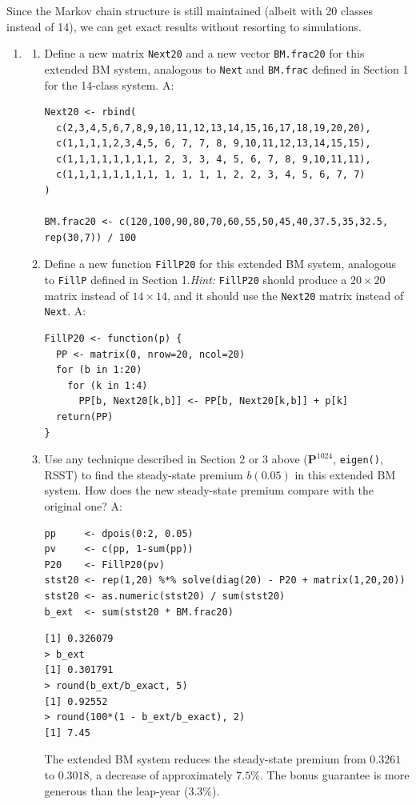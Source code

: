 \documentclass{article}
\begin{document}
Since the Markov chain structure is still maintained (albeit with 20 classes instead of 14), we can get exact results without resorting to simulations.
 
\begin{enumerate}
  \item [$\boldsymbol{Q}_8$]
  \begin{enumerate}
    \item [(a)] Define a new matrix \texttt{Next20} and a new vector \texttt{BM.frac20} for this extended BM system, analogous to \texttt{Next} and \texttt{BM.frac} defined in Section 1 for the 14-class system. \newline
    A:
\begin{lstlisting}
Next20 <- rbind(
  c(2,3,4,5,6,7,8,9,10,11,12,13,14,15,16,17,18,19,20,20),
  c(1,1,1,1,2,3,4,5, 6, 7, 7, 8, 9,10,11,12,13,14,15,15),
  c(1,1,1,1,1,1,1,1, 2, 3, 3, 4, 5, 6, 7, 8, 9,10,11,11),
  c(1,1,1,1,1,1,1,1, 1, 1, 1, 1, 2, 2, 3, 4, 5, 6, 7, 7)
)

BM.frac20 <- c(120,100,90,80,70,60,55,50,45,40,37.5,35,32.5, rep(30,7)) / 100
\end{lstlisting}
    \item [(b)] Define a new function \texttt{FillP20} for this extended BM system, analogous to \texttt{FillP} defined in Section 1.\textit{Hint:} \texttt{FillP20} should produce a $20 \times 20$ matrix instead of $14 \times 14$, and it should use the \texttt{Next20} matrix instead of \texttt{Next}. \newline
    A:
\begin{lstlisting}
FillP20 <- function(p) {
  PP <- matrix(0, nrow=20, ncol=20)
  for (b in 1:20)
    for (k in 1:4)
      PP[b, Next20[k,b]] <- PP[b, Next20[k,b]] + p[k]
  return(PP)
}
\end{lstlisting} \clearpage
    \item[(c)] Use any technique described in Section 2 or 3 above ($\mathbf{P}^{1024}$, \texttt{eigen()}, RSST) to find the steady-state premium $b(0.05)$ in this extended BM system. How does the new steady-state premium compare with the original one? \newline
    A: 
\begin{lstlisting}
pp     <- dpois(0:2, 0.05)
pv     <- c(pp, 1-sum(pp))
P20    <- FillP20(pv)
stst20 <- rep(1,20) %*% solve(diag(20) - P20 + matrix(1,20,20))
stst20 <- as.numeric(stst20) / sum(stst20)
b_ext  <- sum(stst20 * BM.frac20)
\end{lstlisting}
\begin{lstlisting}
[1] 0.326079
> b_ext
[1] 0.301791
> round(b_ext/b_exact, 5)
[1] 0.92552
> round(100*(1 - b_ext/b_exact), 2)
[1] 7.45
\end{lstlisting}
The extended BM system reduces the steady-state premium from $0.3261$ to $0.3018$, a decrease of approximately $7.5\%$. The bonus guarantee is more generous than the leap-year ($3.3\%$).
  \end{enumerate}
\end{enumerate}
\clearpage
 
\end{document}
